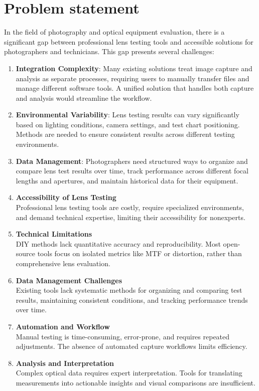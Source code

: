 \section*{Problem statement}
In the field of photography and optical equipment evaluation, there is a significant gap between professional lens testing tools and accessible solutions for photographers and technicians. This gap presents several challenges:

\begin{enumerate}
    \item \textbf{Integration Complexity}: Many existing solutions treat image capture and analysis as separate processes, requiring users to manually transfer files and manage different software tools. A unified solution that handles both capture and analysis would streamline the workflow.
    
    \item \textbf{Environmental Variability}: Lens testing results can vary significantly based on lighting conditions, camera settings, and test chart positioning. Methods are needed to ensure consistent results across different testing environments.
    
    \item \textbf{Data Management}: Photographers need structured ways to organize and compare lens test results over time, track performance across different focal lengths and apertures, and maintain historical data for their equipment.

    \item \textbf{Accessibility of Lens Testing} \\
        Professional lens testing tools are costly, require specialized environments, and demand technical expertise, limiting their accessibility for nonexperts.
        
    \item \textbf{Technical Limitations} \\
        DIY methods lack quantitative accuracy and reproducibility. Most open-source tools focus on isolated metrics like MTF or distortion, rather than comprehensive lens evaluation.
        
    \item \textbf{Data Management Challenges} \\
        Existing tools lack systematic methods for organizing and comparing test results, maintaining consistent conditions, and tracking performance trends over time.

    \item \textbf{Automation and Workflow} \\
        Manual testing is time-consuming, error-prone, and requires repeated adjustments. The absence of automated capture workflows limits efficiency.

    \item \textbf{Analysis and Interpretation} \\
        Complex optical data requires expert interpretation. Tools for translating measurements into actionable insights and visual comparisons are insufficient.
\end{enumerate}


